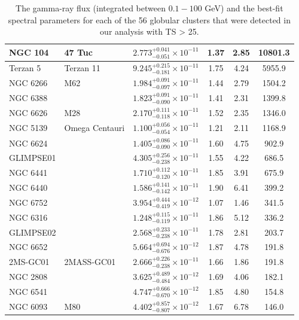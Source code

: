 \begin{longtable}{|l|l|l|c|c|c|}
\hline
\noalign{\vspace{10pt}}
\caption{The gamma-ray flux (integrated between $0.1-100$ GeV) and the best-fit spectral parameters for each of the 56 globular clusters that were detected in our analysis with TS > 25.}
\endlastfoot %
NGC 104 & 47 Tuc & $2.773^{+0.041}_{-0.051} \times 10^{-11}$ & 1.37 & 2.85 & 10801.3 \\\hline
Terzan 5 & Terzan 11 & $9.245^{+0.215}_{-0.181} \times 10^{-11}$ & 1.75 & 4.24 & 5955.9 \\\hline
NGC 6266 & M62 & $1.984^{+0.091}_{-0.097} \times 10^{-11}$ & 1.44 & 2.79 & 1504.2 \\\hline
NGC 6388 & & $1.823^{+0.091}_{-0.090} \times 10^{-11}$ & 1.41 & 2.31 & 1399.8 \\\hline
NGC 6626 & M28 & $2.170^{+0.111}_{-0.118} \times 10^{-11}$ & 1.52 & 2.35 & 1346.0 \\\hline
NGC 5139 & Omega Centauri & $1.100^{+0.056}_{-0.054} \times 10^{-11}$ & 1.21 & 2.11 & 1168.9 \\\hline
NGC 6624 & & $1.405^{+0.086}_{-0.090} \times 10^{-11}$ & 1.60 & 4.75 & 902.9 \\\hline
GLIMPSE01 & & $4.305^{+0.256}_{-0.238} \times 10^{-11}$ & 1.55 & 4.22 & 686.5 \\\hline
NGC 6441 & & $1.710^{+0.112}_{-0.120} \times 10^{-11}$ & 1.85 & 3.91 & 675.9 \\\hline
NGC 6440 & & $1.586^{+0.141}_{-0.142} \times 10^{-11}$ & 1.90 & 6.41 & 399.2 \\\hline
NGC 6752 & & $3.954^{+0.444}_{-0.419} \times 10^{-12}$ & 1.07 & 1.46 & 341.5 \\\hline
NGC 6316 & & $1.248^{+0.115}_{-0.119} \times 10^{-11}$ & 1.86 & 5.12 & 336.2 \\\hline
GLIMPSE02 & & $2.568^{+0.233}_{-0.238} \times 10^{-11}$ & 1.78 & 2.81 & 203.7 \\\hline
NGC 6652 & & $5.664^{+0.694}_{-0.676} \times 10^{-12}$ & 1.87 & 4.78 & 191.8 \\\hline
2MS-GC01 & 2MASS-GC01 & $2.666^{+0.226}_{-0.238} \times 10^{-11}$ & 1.66 & 1.86 & 191.8 \\\hline
NGC 2808 & & $3.625^{+0.489}_{-0.484} \times 10^{-12}$ & 1.69 & 4.06 & 182.1 \\\hline
NGC 6541 & & $4.747^{+0.666}_{-0.670} \times 10^{-12}$ & 1.85 & 4.80 & 154.8 \\\hline
NGC 6093 & M80 & $4.402^{+0.857}_{-0.807} \times 10^{-12}$ & 1.67 & 6.78 & 146.0 \\\hline

\end{longtable}
